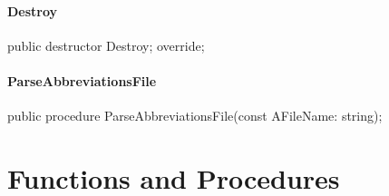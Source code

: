 \documentclass{report}
\newif\ifpdf
\begin{document}
\paragraph*{Destroy}\hspace*{\fill}

\label{PasDoc_Gen.TDocGenerator-Destroy}
\begin{list}{}{
\setlength{\itemindent}{0cm}
\setlength{\listparindent}{0cm}
\setlength{\leftmargin}{\evensidemargin}
\addtolength{\leftmargin}{\tmplength}
\settowidth{\labelsep}{X}
\addtolength{\leftmargin}{\labelsep}
\setlength{\labelwidth}{\tmplength}
}
\item[\textbf{Declaration}\hfill]
\ifpdf
\begin{flushleft}
\fi
\begin{ttfamily}
public destructor Destroy; override;\end{ttfamily}

\ifpdf
\end{flushleft}
\fi

\end{list}
\paragraph*{ParseAbbreviationsFile}\hspace*{\fill}

\label{PasDoc_Gen.TDocGenerator-ParseAbbreviationsFile}
\begin{list}{}{
\setlength{\itemindent}{0cm}
\setlength{\listparindent}{0cm}
\setlength{\leftmargin}{\evensidemargin}
\addtolength{\leftmargin}{\tmplength}
\settowidth{\labelsep}{X}
\addtolength{\leftmargin}{\labelsep}
\setlength{\labelwidth}{\tmplength}
}
\item[\textbf{Declaration}\hfill]
\ifpdf
\begin{flushleft}
\fi
\begin{ttfamily}
public procedure ParseAbbreviationsFile(const AFileName: string);\end{ttfamily}

\ifpdf
\end{flushleft}
\fi

\end{list}
\section{Functions and Procedures}
\ifpdf
\end{document}

